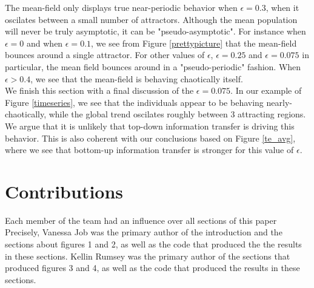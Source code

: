 \documentclass[conference]{IEEEtran}
\begin{document}
\noindent The mean-field only displays true near-periodic behavior when $\epsilon = 0.3$, when it oscilates between a small number of attractors. Although the mean population will never be truly asymptotic, it can be "pseudo-asymptotic". For instance when $\epsilon = 0$ and when $\epsilon = 0.1$, we see from Figure \ref{prettypicture} that the mean-field bounces around a single attractor. For other values of $\epsilon$, $\epsilon = 0.25$ and $\epsilon = 0.075$ in particular, the mean field bounces around in a "pseudo-periodic" fashion. When $\epsilon > 0.4$, we see that the mean-field is behaving chaotically itself.  \\

\noindent We finish this section with a final discussion of the $\epsilon = 0.075$. In our example of Figure \ref{timeseries}, we see that the individuals appear to be behaving nearly-chaotically, while the global trend oscilates roughly between $3$ attracting regions. We argue that it is unlikely that top-down information transfer is driving this behavior. This is also coherent with our conclusions based on Figure \ref{te_avg}, where we see that bottom-up information transfer is stronger for this value of $\epsilon$.










\section{Contributions}

\noindent Each member of the team had an influence over all sections of this paper Precisely, Vanessa Job was the primary author of the introduction and the sections about figures 1 and 2, as well as the code that produced the the results in these sections.   Kellin Rumsey was the primary author of the sections that produced figures 3 and 4, as well as the code that produced the results in these sections.  


\end{document}
